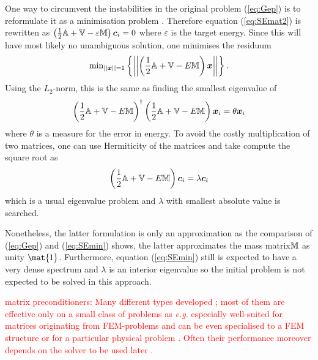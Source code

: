 One way to circumvent the instabilities in the original problem (\ref{eq:Gep}) is to reformulate it as a minimisation problem \cite{H2pDeCleva}.
Therefore equation (\ref{eq:SEmat2}) is rewritten as $\left(\frac 12 \mathbb{A}+\mathbb{V} - \varepsilon \mathbb{M}\right)\bm{c}_i = 0$ where $\varepsilon$ is the target energy.
Since this will have most likely no unambiguous solution, one minimises the residuum
\begin{equation}
\text{min}_{||\bm{x}||=1}\left\{\left|\left|\left(\frac 12 \mathbb{A}+\mathbb{V}-E\mathbb{M}\right)\bm{x} \right|\right| \right\}.
\end{equation}
Using the $L_2$-norm, this is the same as finding the smallest eigenvalue of
\begin{equation}
\left(\frac 12 \mathbb{A}+\mathbb{V}-E\mathbb{M}\right)^\dagger
\left(\frac 12 \mathbb{A}+\mathbb{V}-E\mathbb{M}\right) \bm{x}_i = \theta \bm{x}_i
\end{equation}
where $\theta$ is a measure for the error in energy.
To avoid the costly multiplication of two matrices, one can use  Hermiticity of the matrices and take compute the
square root as
\begin{equation} \label{eq:SEmin}
\left(\frac 12 \mathbb{A}+\mathbb{V}-E\mathbb{M}\right)\bm{c}_i = \lambda \bm{c}_i
\end{equation}
which is a usual eigenvalue problem \cite{H2pDeCleva} and $\lambda$ with smallest absolute value is searched.

Nonetheless, the latter formulation is only an approximation as the comparison of (\ref{eq:Gep}) and (\ref{eq:SEmin}) shows, the latter approximates the mass matrix$\mathbb{M}$ as unity $\mat{1}$.
Furthermore, equation (\ref{eq:SEmin}) still is expected to have a very dense spectrum and $\lambda$ is an interior eigenvalue so the initial problem is not expected to be solved in this approach.

\textcolor{red}{matrix preconditioners: Many different types developed \cite{Helmke2010}; most of them are effective only on a small class of problems as \textit{e.g.} especially well-suited for matrices originating from FEM-problems \cite{PrecFem, PrecFem2} and can be even specialised to a FEM structure \cite{MultPrec,MultPrec2} or for a particular physical problem \cite{HelmhPrec}. Often their performance moreover depends on the solver to be used later \cite{PrecKr}.}

